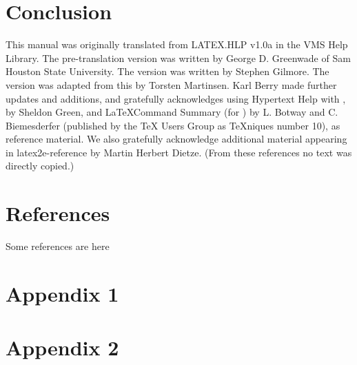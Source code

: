 \documentclass[12pt, twocolumn, a4paper]{article}
\begin{document}
	\section{Conclusion} \label{conclusion}
		This manual was originally translated from LATEX.HLP v1.0a in the VMS Help Library.  The pre-translation version was written by George D. Greenwade of Sam Houston State University.  The  version was written by Stephen Gilmore.  The \LaTeXe version was adapted from this by Torsten Martinsen.  Karl Berry made further updates and additions, and gratefully acknowledges using Hypertext Help with \LaTeXe, by Sheldon Green, and \LaTeX Command Summary (for ) by L. Botway and C. Biemesderfer (published by the TeX Users Group as TeXniques number 10), as reference material.  We also gratefully acknowledge additional material appearing in latex2e-reference by Martin Herbert Dietze.  (From these references no text was directly copied.)
	
	\section*{References}
		Some references are here
		
	\section*{Appendix 1}
	
	\section*{Appendix 2}
	
\end{document}

